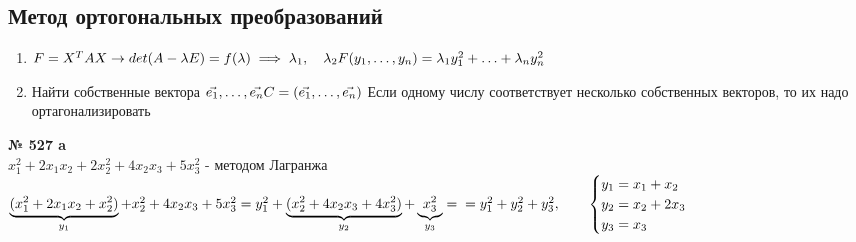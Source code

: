 \documentclass[12pt]{article}
\newenvironment{task}[1][0]{\vspace{.5cm} {\textbf{№ #1} \vspace{.5cm}\\ }}{}
\begin{document}
\subsection{Метод ортогональных преобразований}
\begin{enumerate}
	\item $F=X^TAX \rightarrow det(A-\lambda E)=f(\lambda) \implies \lambda_1, \quad \lambda_2\\
	F(y_1, \ldots, y_n) = \lambda_1 y_1^2+\ldots +\lambda_n y_n^2\\$
	\item {Найти собственные вектора $\vec{e_1}, \ldots, \vec{e_n}\\
C=(\vec{e_1}, \ldots, \vec{e_n})\\$
Если одному числу соответствует несколько собственных векторов, то их надо ортагонализировать}
\end{enumerate}


\vspace{2cm}
\begin{task}[527 a]
$x_1^2+2x_1x_2+2x_2^2+4x_2x_3+5x_3^2$ - методом Лагранжа\vspace{.2cm	}\\
$\underbrace{(x_1^2+2x_1x_2+x_2^2)}_{y_1}+x_2^2+4x_2x_3+5x_3^2=y_1^2+\underbrace{(x_2^2+4x_2x_3+4x_3^2)}_{y_2}+\underbrace{x_3^2}_{y_3}=\\=y_1^2+y_2^2+y_3^2, \qquad
\begin{cases}
	y_1=x_1+x_2\\
	y_2=x_2+2x_3\\
	y_3=x_3\\
\end{cases}$
\end{task}
\end{document}
